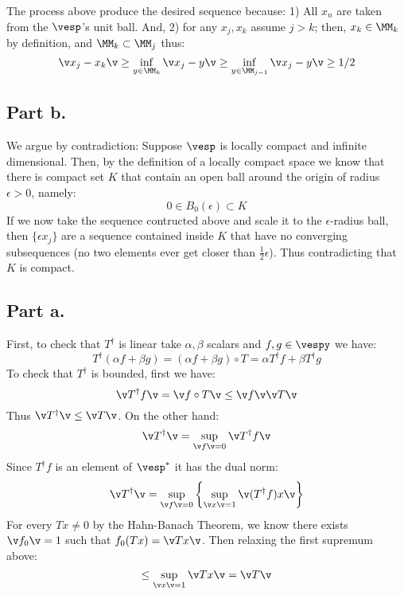 The process above produce the desired sequence because: 1) All $x_n$ are taken from the $\vesp$'s unit ball.
And, 2) for any $x_j,x_k$ assume $j>k$; then, $x_k \in \MM_k$ by definition, and $\MM_k\subset \MM_j$ thus:
$$\v x_j - x_k\v\geq \inf_{y\in \MM_{k}}\v x_j -y \v \geq \inf_{y\in \MM_{j-1}} \v x_j -y\v \geq 1/2$$

\subsection*{Part \textbf{b.}}
We argue by contradiction:
Suppose $\vesp$ is locally compact and infinite dimensional. 
Then, by the definition of a locally compact space we know that there is compact set $K$ that contain an open ball around the origin of radius $\epsilon>0$, namely:
$$0\in B_0(\epsilon) \subset K$$
If we now take the sequence contructed above and scale it to the $\epsilon$-radius ball, then $\{\epsilon x_j \}$ are a sequence contained inside $K$ that have no converging subsequences (no two elements ever get closer than $\frac 12 \epsilon$).
Thus contradicting that $K$ is compact. 

\subsection*{Part \textbf{a.}}
First, to check that $T^\dagger$ is linear take $\alpha, \beta$ scalars and $f,g\in \vespy$ we have:
$$T^\dagger (\alpha f+\beta g)= (\alpha f+ \beta g) \circ T = \alpha T^\dagger f + \beta T^\dagger g $$
To check that $T^\dagger $ is bounded, first we have:
$$\v T^\dagger f \v = \v f\circ T \v \leq \v f\v \v T\v $$
Thus $\v T^\dagger \v \leq \v T\v$. On the other hand:
$$\v T^\dagger \v  = \sup_{\v f\v =0} \v T^\dagger f \v$$
Since $T^\dagger f$ is an element of $\vesp^*$ it has the dual norm:
$$\v T^\dagger \v  = \sup_{\v f\v =0} \left\{ \sup_{\v x\v =1} \v (T^\dagger f)x\v \right\}$$
For every $Tx\neq 0$ by the Hahn-Banach Theorem, we know there exists $\v f_0 \v =1$ such that $f_0(Tx) = \v T x\v$. Then relaxing the first supremum above:
$$\leq \sup_{\v x\v =1} \v Tx\v = \v T \v$$

